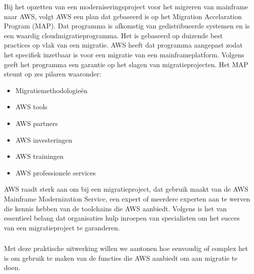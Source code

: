 Bij het opzetten van een moderniseringsproject voor het migreren van mainframe naar AWS, volgt AWS een plan dat gebaseerd is op het Migration Accelaration Program (MAP). Dat programma is afkomstig van gedistribueerde systemen en is een waardig cloudmigratieprogramma. Het is gebaseerd op duizende best practices op vlak van een migratie. AWS heeft dat programma aangepast zodat het specifiek inzetbaar is voor een migratie van een mainframeplatform. Volgens \textcite{Valence2021} geeft het programma een garantie op het slagen van migratieprojecten. Het MAP steunt op zes pilaren waaronder:
 \begin{itemize}
    \item Migratiemethodologieën
    \item AWS tools
    \item AWS partners
    \item AWS investeringen
    \item AWS trainingen
    \item AWS professionele services
\end{itemize}

AWS raadt sterk aan om bij een migratieproject, dat gebruik maakt van de AWS Mainframe Modernization Service, een expert of meerdere experten aan te werven die kennis hebben van de toolchains die AWS aanbiedt. Volgens \textcite{Valence2021} is het van essentieel belang dat organisaties hulp inroepen van specialisten om het succes van een migratieproject te garanderen. 

\subsubsection{}
\label{sec: Een praktische uitwerking: uitvoeren  van COBOL applicatie op AWS Lambda}

Met deze praktische uitwerking willen we aantonen hoe eenvoudig of complex het is om gebruik te maken van de functies die AWS aanbiedt om aan migratie te doen.

